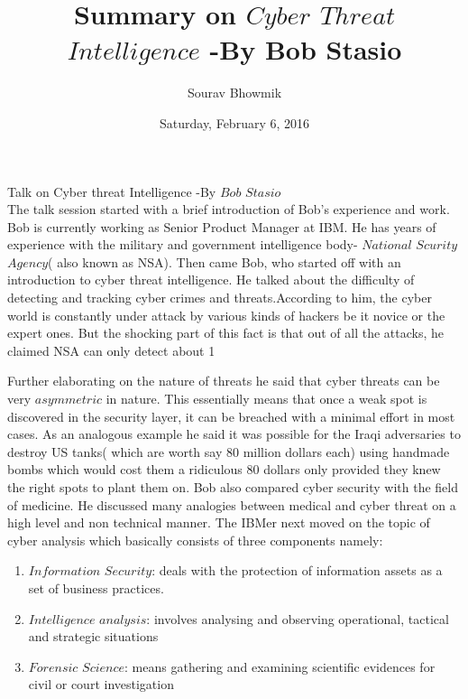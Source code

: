 \documentclass{article}
\title{Summary on
 $Cyber$ $Threat$ $Intelligence$ -By Bob Stasio}
\author{Sourav Bhowmik}
\date{Saturday, February 6, 2016}
\begin{document}
		\maketitle
		Talk on Cyber threat Intelligence -By $Bob$ $Stasio$\\
The talk session started with a brief introduction of Bob's experience and work. Bob is currently working as Senior Product Manager at IBM. He has years of experience with the military and government intelligence body- $National$ $Scurity$ $Agency$( also known as NSA). Then came Bob, who started off with an introduction to cyber threat intelligence. He talked about the difficulty of detecting and tracking cyber crimes and threats.According to him, the cyber world is constantly under attack by various kinds of hackers be it novice or the expert ones. But the shocking part of this fact is that out of all the attacks, he claimed NSA can only detect about 1%

Further elaborating on the nature of threats he said that cyber threats can be very $asymmetric$ in nature. This essentially means that once a weak spot is discovered in the security layer, it can be breached with a minimal effort in most cases. As an analogous example he said it was possible for the Iraqi adversaries to destroy US tanks( which are worth say 80 million dollars each) using handmade bombs which would cost them a ridiculous 80 dollars only provided they knew the right spots to plant them on. Bob also compared cyber security with the field of medicine. He discussed many analogies between medical and cyber threat on a high level and non technical manner.
The IBMer next moved on the topic of cyber analysis which basically consists of three components namely:
\begin{enumerate}
\item $Information$ $Security$: deals with the protection of information assets as a set of business practices.
\item $Intelligence$ $analysis$: involves analysing and observing operational, tactical and strategic situations
\item $Forensic$ $Science$: means gathering and examining scientific evidences for civil or court investigation
\end{enumerate}
\end{document}
